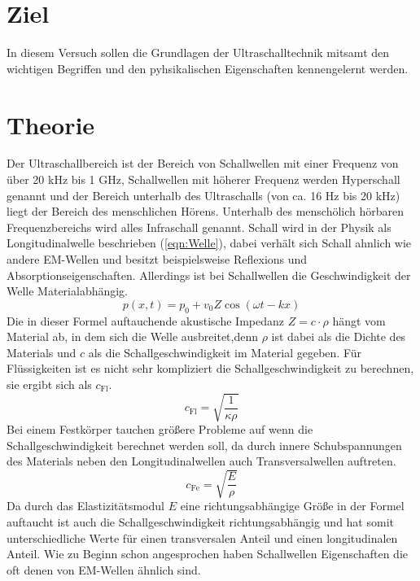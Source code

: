\section{Ziel}
In diesem Versuch sollen die Grundlagen der Ultraschalltechnik mitsamt den wichtigen Begriffen und den pyhsikalischen Eigenschaften kennengelernt werden.
\section{Theorie}
\label{sec:Theorie}

Der Ultraschallbereich ist der Bereich von Schallwellen mit einer Frequenz von über 20 kHz bis 1 GHz, Schallwellen mit höherer Frequenz werden Hyperschall genannt und der Bereich unterhalb des Ultraschalls (von ca. 16 Hz bis 20 kHz) liegt der Bereich des menschlichen Hörens.
Unterhalb des menschölich hörbaren Frequenzbereichs wird alles Infraschall genannt.
Schall wird in der Physik als Longitudinalwelle beschrieben (\ref{eqn:Welle}), dabei verhält sich Schall ahnlich wie andere EM-Wellen und besitzt beispielsweise Reflexions und Absorptionseigenschaften.
Allerdings ist bei Schallwellen die Geschwindigkeit der Welle Materialabhängig.
\begin{equation}
    p(x,t)= p_0 + v_0 Z \cos\left(\omega t - k x\right) \label{eqn:Welle}
\end{equation}
Die in dieser Formel auftauchende akustische Impedanz $Z = c \cdot \rho$ hängt vom Material ab, in dem sich die Welle ausbreitet,denn $\rho$ ist dabei als die Dichte des Materials und $c$ als die Schallgeschwindigkeit im Material gegeben.
Für Flüssigkeiten ist es nicht sehr kompliziert die Schallgeschwindigkeit zu berechnen, sie ergibt sich als $c_{\text{Fl}}$.
\begin{equation}
    c_{\text{Fl}} = \sqrt{\frac{1}{\kappa \rho}} \nonumber
\end{equation}
Bei einem Festkörper tauchen größere Probleme auf wenn die Schallgeschwindigkeit berechnet werden soll, da durch innere Schubspannungen des Materials neben den Longitudinalwellen auch Transversalwellen auftreten.
\begin{equation}
    c_{\text{Fe}} = \sqrt{\frac{E}{\rho}} \nonumber
\end{equation}
Da durch das Elastizitätsmodul $E$ eine richtungsabhängige Größe in der Formel auftaucht ist auch die Schallgeschwindigkeit  richtungsabhängig und hat somit unterschiedliche Werte für einen transversalen Anteil und einen longitudinalen Anteil.
Wie zu Beginn schon angesprochen haben Schallwellen Eigenschaften die oft denen von EM-Wellen ähnlich sind.
